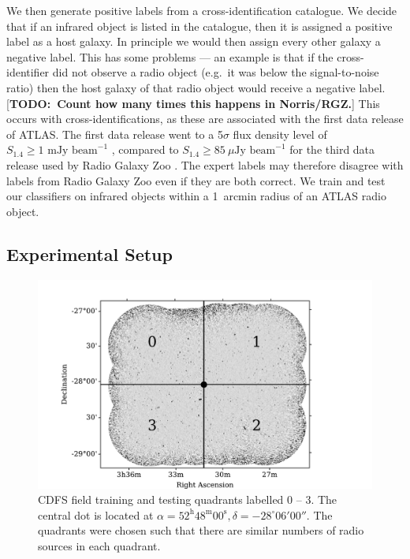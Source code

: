 \documentclass[fleqn,usenatbib,usedcolumn]{mnras}
\newcommand{\todo}[1]{ {\color{red}[{\bf TODO:~{#1}}]} }
\begin{document}
    We then generate positive labels from a cross-identification catalogue.
    We decide that if an infrared object is listed in the catalogue, then it
    is assigned a positive label as a host galaxy. In principle we would
    then assign every other galaxy a negative label. This has some problems
    --- an example is that if the cross-identifier did not observe a radio
    object (e.g.~it was below the signal-to-noise ratio) then the host galaxy of
    that radio object would receive a negative label. \todo{Count how many times
    this happens in Norris/RGZ.} This occurs with \citet{norris06}
    cross-identifications, as these are associated with the first data release
    of ATLAS. The first data release went to a 5$\sigma$ flux density level of
    $S_{1.4} \geq 1 \text{ mJy beam}^{-1}$ \citep{norris06}, compared to
    $S_{1.4} \geq 85\ \mu\text{Jy beam}^{-1}$ for the third data release used by
    Radio Galaxy Zoo \citep{franzen15}. The expert labels may therefore disagree
    with labels from Radio Galaxy Zoo even if they are both correct. We train
    and test our classifiers on infrared objects within a 1~arcmin radius of an
    ATLAS radio object.

  \subsection{Experimental Setup}
  \label{sec:experimental-setup}

    \begin{figure}
      \centering
      \includegraphics[width=\columnwidth]{images/quadrants.pdf}
      \caption{CDFS field training and testing quadrants labelled 0 -- 3. The
        central dot is located at $\alpha = 52^\text{h}48^\text{m}00^\text{s},
        \delta = -28^\circ{}06'00''$. The quadrants were chosen such that
        there are similar numbers of radio sources in each
        quadrant.\label{fig:quadrants}}
    \end{figure}
\end{document}

